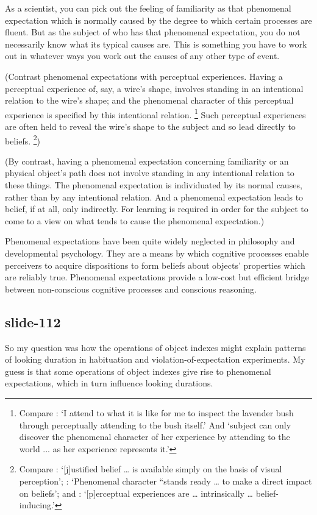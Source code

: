 \documentclass[12pt,\papersize]{extarticle}
\begin{document}
As a scientist, you can pick out the feeling of familiarity as that
phenomenal expectation which is normally caused by the degree to which
certain processes are fluent.
But as the subject of who has that phenomenal expectation, you do not
necessarily know what its typical causes are.
This is something you have to work out in whatever ways you work out
the causes of any other type of event.

(Contrast phenomenal expectations with perceptual experiences.
Having
a perceptual experience of, say, a wire’s shape, involves standing
in an intentional relation to the wire’s shape; and the phenomenal
character of this perceptual experience is specified by this
intentional relation.%
\footnote{
Compare \citet[p.~380]{Martin:2002yx}:
‘I attend to what it is like for me to inspect the lavender bush through
perceptually attending to the bush itself.’
And \citet[p.~211]{byrne:2001_intentionalism}
‘subject can only discover the phenomenal character of her experience by
attending to the world ... as her experience represents it.’
}
Such perceptual experiences are often held to reveal the wire’s shape to the
subject and so lead directly to beliefs.%
\footnote{
Compare \citet[p.~222]{Johnston:1992zb}:
‘[j]ustified belief … is available simply on the basis of visual perception’;
\citet[p.~143–4]{Tye:1995oa}:
‘Phenomenal character “stands ready … to make a direct impact on beliefs’;
and
\citet[p.~291]{Smith:2001iz}:
‘[p]erceptual experiences are … intrinsically … belief-inducing.’
})

(By contrast, having a phenomenal expectation concerning familiarity or an
physical object’s path does not involve standing in any intentional relation
to these things.
The phenomenal expectation is individuated by its normal causes, rather
than by any intentional relation.
And a phenomenal expectation leads to belief, if at all, only indirectly.
For learning is required in order for the subject to come to a view on
what tends to cause the phenomenal expectation.)

Phenomenal expectations have been quite widely neglected in philosophy and
developmental psychology.
They are a means by which cognitive processes enable perceivers to
acquire dispositions to form beliefs about objects’ properties which are
reliably true.
Phenomenal expectations provide a low-cost but efficient bridge between
non-conscious cognitive processes and conscious reasoning.

\subsection{slide-112}
So my question was how the operations of object indexes might
explain patterns of looking duration in habituation and
violation-of-expectation experiments.
My guess is that some operations of object indexes give rise to
phenomenal expectations, which in turn influence looking durations.
\end{document}
